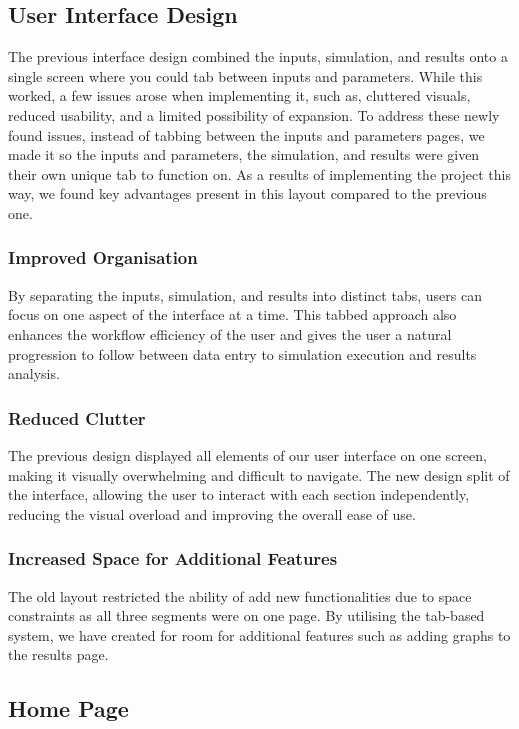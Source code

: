 \documentclass{article}
\begin{document}
    \subsection{User Interface Design}
    The previous interface design combined the inputs, simulation, and results onto a single screen where you could tab between inputs and parameters. While this worked,
    a few issues arose when implementing it, such as, cluttered visuals, reduced usability, and a limited possibility of expansion. To address these newly found issues,
    instead of tabbing between the inputs and parameters pages, we made it so the inputs and parameters, the simulation, and results were given their own unique tab to
    function on. As a results of implementing the project this way, we found key advantages present in this layout compared to the previous one.

    \subsubsection{Improved Organisation}
    By separating the inputs, simulation, and results into distinct tabs, users can focus on one aspect of the interface at a time. This tabbed approach also enhances
    the workflow efficiency of the user and gives the user a natural progression to follow between data entry to simulation execution and results analysis.

    \subsubsection{Reduced Clutter}
    The previous design displayed all elements of our user interface on one screen, making it visually overwhelming and difficult to navigate. The new design split of
    the interface, allowing the user to interact with each section independently, reducing the visual overload and improving the overall ease of use.

    \subsubsection{Increased Space for Additional Features}
    The old layout restricted the ability of add new functionalities due to space constraints as all three segments were on one page. By utilising the tab-based system,
    we have created for room for additional features such as adding graphs to the results page.

    \subsection{Home Page}
\end{document}
